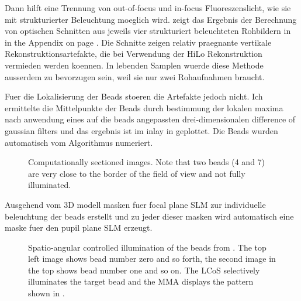 Dann  hilft eine Trennung von out-of-focus und in-focus
Fluoreszenslicht, wie sie mit strukturierter Beleuchtung moeglich
wird.  zeigt das Ergebnis der Berechnung von
optischen Schnitten aus jeweils vier strukturiert beleuchteten
Rohbildern in  in the Appendix on page
\pageref{fig:m_phase}.  Die Schnitte zeigen relativ praegnante
vertikale Rekonstruktionsartefakte, die bei Verwendung der HiLo
Rekonstruktion vermieden werden koennen. In lebenden Samplen wuerde
diese Methode ausserdem zu bevorzugen sein, weil sie nur zwei
Rohaufnahmen braucht.

Fuer  die Lokalisierung der Beads stoeren die
Artefakte jedoch nicht. Ich ermittelte die Mittelpunkte der Beads
durch bestimmung der lokalen maxima nach anwendung eines auf die beads
angepassten drei-dimensionalen difference of gaussian filters und das
ergebnis ist im inlay in  geplottet. Die Beads
wurden automatisch vom Algorithmus numeriert.

\begin{figure}[hbtp]
  \centering
  \caption{Computationally sectioned images. Note that two beads (4
    and 7) are very close to the border of the field of view and not
    fully illuminated.}
  \label{fig:m_sec}
\end{figure}

Ausgehend vom 3D modell masken fuer focal plane SLM zur individuelle
beleuchtung der beads erstellt und zu jeder dieser masken wird
automatisch eine maske fuer den pupil plane SLM erzeugt. 



\begin{figure}[hbtp]
  \centering
  \caption{Spatio-angular controlled illumination of the beads from
    . The top left image shows bead number zero and
    so forth, the second image in the top shows bead number one and so
    on. The LCoS selectively illuminates the target bead and the MMA
    displays the pattern shown in .}
  \label{fig:m_ang}
\end{figure}


\begin{figure}[!hbt]
  \centering
  \caption{}
  \label{fig:montage-ang}
\end{figure}




